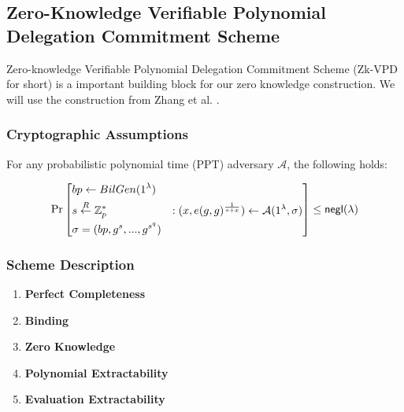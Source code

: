 
\subsection{Zero-Knowledge Verifiable Polynomial Delegation Commitment Scheme}

Zero-knowledge Verifiable Polynomial Delegation Commitment Scheme (Zk-VPD for short) is a important building block for our zero knowledge construction. We will use the construction from Zhang et al. \cite{zkvpd}.

\subsubsection{Cryptographic Assumptions}

\begin{assumption}
	\label{asp::qSDH}
	For any probabilistic polynomial time (PPT) adversary $\mathcal{A}$, the following holds:

	\[\Pr\left[ \begin{aligned}
		&bp \leftarrow BilGen(1^\lambda) & \\
		&s \overset{R}{\leftarrow} \mathbb{Z}^{*}_{p} & : (x, e(g, g)^{\frac{1}{s+x}}) \leftarrow \mathcal{A}(1^\lambda, \sigma)\\
		&\sigma = (bp, g^s, ..., g^{s^q})
	\end{aligned} \right] \le {\sf negl}{(\lambda)}\]
\end{assumption}
\begin{assumption}
	\label{asp::dlEPKE}
\end{assumption}

\subsubsection{Scheme Description}

\begin{definition}
	\label{def::zkvpd}
	\begin{enumerate}
		\item \textbf{Perfect Completeness}
		\item \textbf{Binding}
		\item \textbf{Zero Knowledge}
		\item \textbf{Polynomial Extractability}
		\item \textbf{Evaluation Extractability}
	\end{enumerate}
\end{definition}